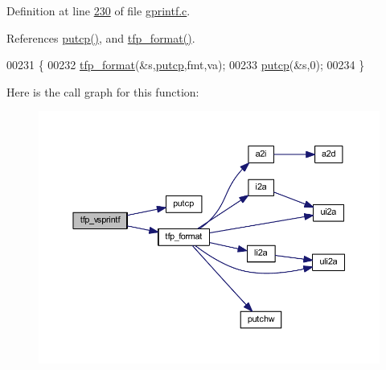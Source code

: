 Definition at line \hyperlink{a00043_source_l00230}{230} of file \hyperlink{a00043_source}{gprintf.\+c}.



References \hyperlink{a00043_source_l00223}{putcp()}, and \hyperlink{a00043_source_l00143}{tfp\+\_\+format()}.


\begin{DoxyCode}
00231     \{
00232     \hyperlink{a00043_a2e6857db4b5af96ebbfa61da86245dc5}{tfp\_format}(&s,\hyperlink{a00043_af8c19e7fd316d83ac94d9bed9fccbf76}{putcp},fmt,va);
00233     \hyperlink{a00043_af8c19e7fd316d83ac94d9bed9fccbf76}{putcp}(&s,0);
00234     \}
\end{DoxyCode}


Here is the call graph for this function\+:\nopagebreak
\begin{figure}[H]
\begin{center}
\leavevmode
\includegraphics[width=350pt]{d5/df9/a00044_aa8dfc5ac91747032198002a008a6aa46_cgraph}
\end{center}
\end{figure}


